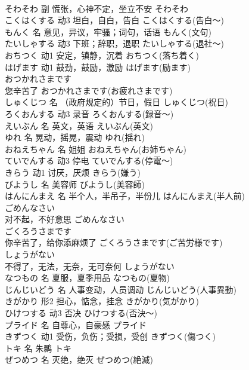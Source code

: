 \documentclass[8pt]{extreport}
\begin{document}
\begin{CJK}{UTF8}{min}
\\	そわそわ	副	慌张，心神不定，坐立不安	そわそわ	
\\	こくはくする	动3	坦白，自白，告白	こくはくする(告白～)	
\\	もんく	名	意见，异议，牢骚；词句，话语	もんく(文句)	
\\	たいしゃする	动3	下班；辞职，退职	たいしゃする(退社～)	
\\	おちつく	动1	安定，镇静，沉着	おちつく(落ち着く)	
\\	はげます	动1	鼓劲，鼓励，激励	はげます(励ます)	
\\	おつかれさまです	
\\	您辛苦了	おつかれさまです(お疲れさまです)	
\\	しゅくじつ	名	（政府规定的）节日，假日	しゅくじつ(祝日)	
\\	ろくおんする	动3	录音	ろくおんする(録音～)	
\\	えいぶん	名	英文，英语	えいぶん(英文)	
\\	ゆれ	名	晃动，摇晃，震动	ゆれ(揺れ)	
\\	おねえちゃん	名	姐姐	おねえちゃん(お姉ちゃん)	
\\	ていでんする	动3	停电	ていでんする(停電～)	
\\	きらう	动1	讨厌，厌烦	きらう(嫌う)	
\\	びようし	名	美容师	びようし(美容師)	
\\	はんにんまえ	名	半个人，半吊子，半份儿	はんにんまえ(半人前)	
\\	ごめんなさい	
\\	对不起，不好意思	ごめんなさい	
\\	ごくろうさまです	
\\	你辛苦了，给你添麻烦了	ごくろうさまです(ご苦労様です)	
\\	しょうがない	
\\	不得了，无法，无奈，无可奈何	しょうがない	
\\	なつもの	名	夏服，夏季用品	なつもの(夏物)	
\\	じんじいどう	名	人事变动，人员调动	じんじいどう(人事異動)	
\\	きがかり	形2	担心，惦念，挂念	きがかり(気がかり)	
\\	ひけつする	动3	否决	ひけつする(否決～)	
\\	プライド	名	自尊心，自豪感	プライド	
\\	きずつく	动1	受伤，负伤；受损，受创	きずつく(傷つく)	
\\	トキ	名	朱鹮	トキ	
\\	ぜつめつ	名	灭绝，绝灭	ぜつめつ(絶滅)	

\end{CJK}
\end{document}

